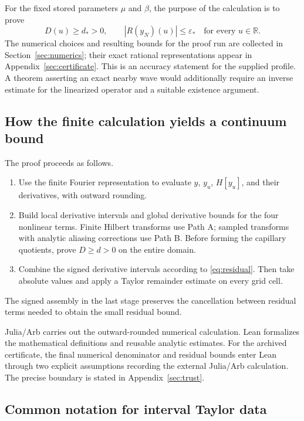 \documentclass[11pt]{article}
\numberwithin{equation}{section}
\begin{document}
For the fixed stored parameters $\mu$ and $\beta$, the purpose of the
calculation is to prove
\begin{equation}
 \boxed{D(u)\geq d_*>0,\qquad
 |R(y_N)(u)|\leq\varepsilon_*
 \quad\text{for every }u\in\mathbb R.}
 \label{eq:objectives}
\end{equation}
The numerical choices and resulting bounds for the proof run are collected
in Section~\ref{sec:numerics}; their exact rational representations appear
in Appendix~\ref{sec:certificate}.
This is an accuracy statement for the supplied profile. A theorem asserting
an exact nearby wave would additionally require an inverse estimate for
the linearized operator and a suitable existence argument.

\subsection{How the finite calculation yields a continuum bound}

The proof proceeds as follows.
\begin{enumerate}
 \item Use the finite Fourier representation to evaluate $y$, $y_u$,
 $H[y_u]$, and their derivatives, with outward rounding.
 \item Build local derivative intervals and global derivative bounds for
 the four nonlinear terms. Finite Hilbert transforms use Path A;
 sampled transforms with analytic aliasing corrections use Path B.
 Before forming the capillary quotients, prove $D\geq d>0$ on the entire
 domain.
 \item Combine the signed derivative intervals according to
 \eqref{eq:residual}. Then take absolute values and apply a Taylor
 remainder estimate on every grid cell.
\end{enumerate}
The signed assembly in the last stage preserves the cancellation between
residual terms needed to obtain the small residual bound.

Julia/Arb carries out the outward-rounded numerical calculation. Lean
formalizes the mathematical definitions and reusable analytic estimates.
For the archived certificate, the final numerical denominator and residual
bounds enter Lean through two explicit assumptions recording the external
Julia/Arb calculation. The precise boundary is stated in
Appendix~\ref{sec:trust}.

\subsection{Common notation for interval Taylor data}
\label{sec:records}
\end{document}
